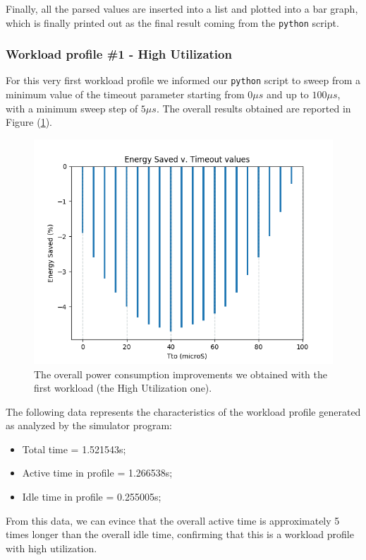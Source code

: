 \documentclass[a4paper]{article}
\begin{document}
            Finally, all the parsed values are inserted into a list and plotted into a bar graph, which is finally printed out as the final result coming from the \texttt{python} script.

        \subsubsection{Workload profile \#1 - High Utilization}
            For this very first workload profile we informed our \texttt{python} script to sweep from a minimum value of the timeout parameter starting from $0 \mu s$ and up to $100 \mu s$, with a minimum sweep step of $5 \mu s$. The overall results obtained are reported in Figure (\ref{fig:Idle_case1}).

            \begin{figure}[htp]
                \centering
                \includegraphics[width=0.6 \columnwidth]{./screenshots/Idle_case1.png}
                \caption{
                        \label{fig:Idle_case1}
                        The overall power consumption improvements we obtained with the first workload (the High Utilization one).
                }
            \end{figure}

            The following data represents the characteristics of the workload profile generated as analyzed by the simulator program:
            \begin{itemize}
                \item Total time = 1.521543s;
                \item Active time in profile = 1.266538s;
                \item Idle time in profile = 0.255005s;
            \end{itemize}

            From this data, we can evince that the overall active time is approximately 5 times longer than the overall idle time, confirming that this is a workload profile with high utilization.
\end{document}
